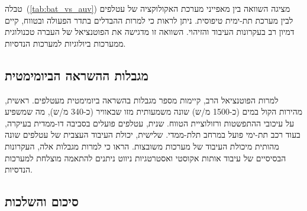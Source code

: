 \begin{table}[htbp]
    \centering
    \caption{השוואה בין מערכת האקולוקציה של עטלפים למערכת  תת-ימית. (Comparison between bat echolocation and underwater SLAM systems.)}
    \label{tab:bat_vs_auv}
\end{table}

טבלה~(\ref{tab:bat_vs_auv}) מציגה השוואה בין מאפייני מערכת האקולוקציה של עטלפים לבין מערכת  תת-ימית טיפוסית. ניתן לראות כי למרות ההבדלים בתדר הפעולה ובטווח, קיים דמיון רב בעקרונות העיבוד והזיהוי. השוואה זו מדגישה את הפוטנציאל של העברה טכנולוגית ממערכות ביולוגיות למערכות הנדסיות.

\subsection{מגבלות ההשראה הביומימטית}
\label{sec:bio_limitations}

למרות הפוטנציאל הרב, קיימות מספר מגבלות בהשראה ביומימטית מעטלפים. ראשית, מהירות הקול במים (כ-1500 מ\!/\!ש) שונה משמעותית מזו שבאוויר (כ-340 מ\!/\!ש), מה שמשפיע על עיכובי ההתפשטות ורזולוציית הטווח. שנית, עטלפים פועלים בסביבה דו-ממדית בעיקרה, בעוד רכב תת-ימי פועל במרחב תלת-ממדי. שלישית, יכולת העיבוד העצבית של עטלפים שונה מהותית מיכולת העיבוד של מערכות משובצות. \citet{Rihaczek1969MatchedFilter} הראו כי למרות מגבלות אלה, העקרונות הבסיסיים של עיבוד אותות אקוסטי ואסטרטגיות ניווט ניתנים להתאמה מוצלחת למערכות הנדסיות.

\subsection{סיכום והשלכות}
\label{sec:bio_summary}

